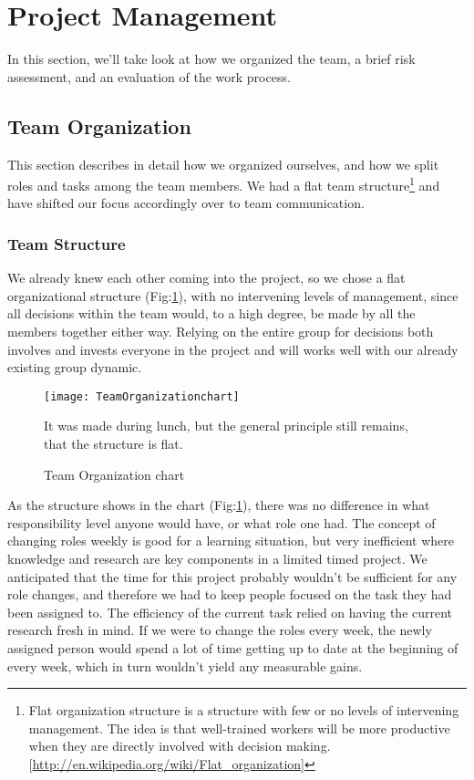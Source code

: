 \section{Project Management}\label{Project Management} 
    In this section, we'll take look at how we organized the team, a brief risk assessment, and an evaluation of the work process. 
    
    \subsection{Team Organization}\label{Team Organization} 
        This section describes in detail how we organized ourselves, and how we split roles and tasks among the team members. We had a flat team structure\footnote{Flat organization structure is a structure with few or no levels of intervening management. The idea is that well-trained workers will be more productive when they are directly involved with decision making. [\url{http://en.wikipedia.org/wiki/Flat_organization}]}  and have shifted our focus accordingly over to team communication. 
    
    \subsubsection{Team Structure}\label{Team Structure}
    We already knew each other coming into the project, so we chose a flat organizational structure (Fig:\ref{fig:TeamOrganizationchart}), with no intervening levels of management, since all decisions within the team would, to a high degree, be made by all the members together either way. Relying on the entire group for decisions both involves and invests everyone in the project and will works well with our already existing group dynamic.

    \begin{figure}[H]
        \centering
        \texttt{[image: TeamOrganizationchart]}
        \caption{Team Organization chart}
        It was made during lunch, but the general principle still remains, that the structure is flat.
        \label{fig:TeamOrganizationchart}
    \end{figure}
    
    As the structure shows in the chart (Fig:\ref{fig:TeamOrganizationchart}), there was no difference in what responsibility level anyone would have, or what role one had. The concept of changing roles weekly is good for a learning situation, but very inefficient where knowledge and research are key components in a limited timed project. We anticipated that the time for this project probably wouldn't be sufficient for any role changes, and therefore we had to keep people focused on the task they had been assigned to. The efficiency of the current task relied on having the current research fresh in mind. If we were to change the roles every week, the newly assigned person would spend a lot of time getting up to date at the beginning of every week, which in turn wouldn't yield any measurable gains. 
    
